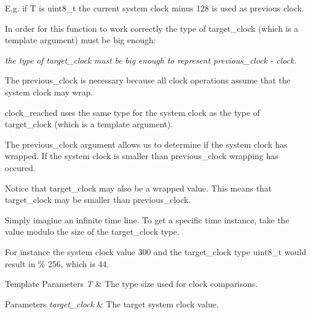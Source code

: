 E.\+g. if T is uint8\+\_\+t the current system clock minus 128 is used as previous clock.


\begin{DoxyItemize}
\item In order for this function to work correctly the type of target\+\_\+clock (which is a template argument) must be big enough\+:
\end{DoxyItemize}

{\itshape the type of target\+\_\+clock must be big enough to represent {\ttfamily previous\+\_\+clock -\/ clock}.}

The previous\+\_\+clock is necessary because all clock operations assume that the system clock may wrap.

clock\+\_\+reached uses the same type for the system clock as the type of target\+\_\+clock (which is a template argument).

The previous\+\_\+clock argument allows us to determine if the system clock has wrapped. If the system clock is smaller than previous\+\_\+clock wrapping has occured.

Notice that target\+\_\+clock may also be a wrapped value. This means that target\+\_\+clock may be smaller than previous\+\_\+clock.

Simply imagine an infinite time line. To get a specific time instance, take the value modulo the size of the target\+\_\+clock type.

For instance the system clock value 300 and the target\+\_\+clock type uint8\+\_\+t would result in { \% 256}, which is 44.


\begin{DoxyTemplParams}{Template Parameters}
{\em T} & The type size used for clock comparisons. \\
\hline
\end{DoxyTemplParams}

\begin{DoxyParams}{Parameters}
{\em target\+\_\+clock} & The target system clock value. \\
\hline
\end{DoxyParams}
\hypertarget{namespaceclock_a2818f7b058e27771426f39c7aa0365cd}{}\label{namespaceclock_a2818f7b058e27771426f39c7aa0365cd} 
